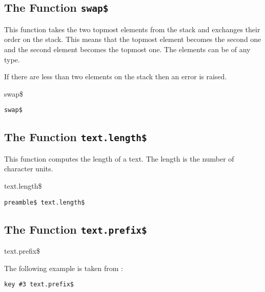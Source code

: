 \subsection{The Function \texttt{swap\$}}%

This function takes the two topmost elements from the stack and
exchanges their order on the stack. This means that the topmost
element becomes the second one and the second element becomes the
topmost one. The elements can be of any type.

If there are less than two elements on the stack then an error is
raised.

\begin{BstFunction}{swap\$}
\end{BstFunction}

\begin{lstlisting}[language=bst]
  swap$
\end{lstlisting}


\subsection{The Function \texttt{text.length\$}}%

This function computes the length of a text. The length is the number
of character units.

\INCOMPLETE

\begin{BstFunction}{text.length\$}
\end{BstFunction}

\begin{lstlisting}[language=bst]
  preamble$ text.length$
\end{lstlisting}


\subsection{The Function \texttt{text.prefix\$}}%

\INCOMPLETE

\begin{BstFunction}{text.prefix\$}
\end{BstFunction}

The following example is taken from :

\begin{lstlisting}[language=bst]
  key #3 text.prefix$
\end{lstlisting}


